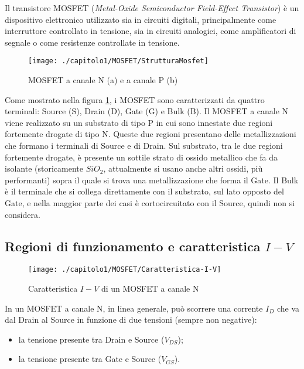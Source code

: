 Il transistore MOSFET (\emph{Metal-Oxide Semiconductor Field-Effect Transistor}) è un dispositivo elettronico utilizzato sia in circuiti digitali, principalmente come interruttore controllato in tensione, sia in circuiti analogici, come amplificatori di segnale o come resistenze controllate in tensione.\\

\begin{figure}[H]
  \centering
  \texttt{[image: ./capitolo1/MOSFET/StrutturaMosfet]}
  \caption[Struttura dei MOSFET]{MOSFET a canale N (a) e a canale P (b)}
  \label{fig:StrutturaMosfet}
\end{figure}

Come mostrato nella figura \ref{fig:StrutturaMosfet}, i MOSFET sono caratterizzati da quattro terminali: Source (S), Drain (D), Gate (G) e Bulk (B).
Il MOSFET a canale N viene realizzato su un substrato di tipo P in cui sono innestate due regioni fortemente drogate di tipo N. Queste due regioni presentano delle metallizzazioni che formano i terminali di Source e di Drain. Sul substrato, tra le due regioni fortemente drogate, è presente un sottile strato di ossido metallico che fa da isolante (storicamente $SiO_2$, attualmente si usano anche altri ossidi, più performanti) sopra il quale si trova una metallizzazione che forma il Gate. Il Bulk è il terminale che si collega direttamente con il substrato, sul lato opposto del Gate, e nella maggior parte dei casi è cortocircuitato con il Source, quindi non si considera.\\

\subsection{Regioni di funzionamento e caratteristica $I-V$}

\begin{figure}[H]
  \centering
  \texttt{[image: ./capitolo1/MOSFET/Caratteristica-I-V]}
  \caption[Caratteristica $I-V$ di un MOSFET a canale N]{Caratteristica $I-V$ di un MOSFET a canale N}
  \label{fig:caratteristica-I-V}
\end{figure}

In un MOSFET a canale N, in linea generale, può scorrere una corrente $I_D$ che va dal Drain al Source in funzione di due tensioni (sempre non negative): 
\begin{itemize}
  \item la tensione presente tra Drain e Source ($V_{DS}$);
  \item la tensione presente tra Gate e Source ($V_{GS}$).  
\end{itemize}

